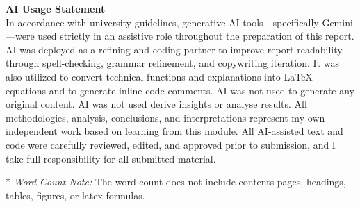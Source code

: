 \documentclass[12pt, a4paper]{article}
\begin{document}
\begin{titlepage}
    \begin{minipage}{0.92\textwidth}
        \small
        \textbf{AI Usage Statement}\\[0.3em]
        In accordance with university guidelines, generative AI tools---specifically Gemini---were used strictly in an assistive role throughout the preparation of this report. AI was deployed as a refining and coding partner to improve report readability through spell-checking, grammar refinement, and copywriting iteration. It was also utilized to convert technical functions and explanations into \LaTeX{} equations and to generate inline code comments. AI was not used to generate any original content. AI was not used derive insights or analyse results. All methodologies, analysis, conclusions, and interpretations represent my own independent work based on learning from this module. All AI-assisted text and code were carefully reviewed, edited, and approved prior to submission, and I take full responsibility for all submitted material.
    \end{minipage}

    \vfill

    \begin{minipage}{0.92\textwidth}
        \tiny
        \color{gray}
        * \textit{Word Count Note:} The word count does not include contents pages, headings, tables, figures, or latex formulas. 
    \end{minipage}
    
\end{titlepage}

\newpage
{}

\tableofcontents
\newpage

\newpage
\listoftables
\vspace{1cm}

\newpage
\listoffigures
\vspace{1cm}


\newpage
{}
\end{document}
